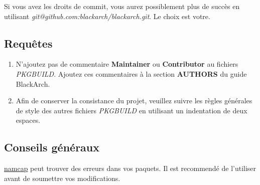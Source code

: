 \documentclass[a4paper, oneside, 11pt]{book}
\begin{document}
Si vous avez les droits de commit, vous aurez possiblement plus de succès en
utilisant \textit{git@github.com:blackarch/blackarch.git}. Le choix est votre.

\subsection{Requêtes}
\begin{enumerate}
\item N'ajoutez pas de commentaire \textbf{Maintainer} ou \textbf{Contributor}
au fichiers \textit{PKGBUILD}. Ajoutez ces commentaires à la section
\textbf{AUTHORS} du guide BlackArch.
\item Afin de conserver la consistance du projet, veuillez suivre les règles
générales de style des autres fichiers \textit{PKGBUILD} en utilisant un
indentation de deux espaces.
\end{enumerate}

\subsection{Conseils généraux}
\href{http://wiki.archlinux.org/index.php/Namcap}{namcap} peut trouver des
erreurs dans vos paquets. Il est recommendé de l'utiliser avant de soumettre vos
modifications.

\appendix

\end{document}
